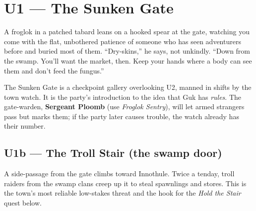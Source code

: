 \documentclass[10pt,twoside]{report}
\begin{document}
\begin{center}
\end{center}

\section{U1 --- The Sunken Gate}
\begin{readaloud}
A froglok in a patched tabard leans on a hooked spear at the gate, watching you come with the flat, unbothered patience of someone who has seen adventurers before and buried most of them. ``Dry-skins,'' he says, not unkindly. ``Down from the swamp. You'll want the market, then. Keep your hands where a body can see them and don't feed the fungus.''
\end{readaloud}
The Sunken Gate is a checkpoint gallery overlooking U2, manned in shifts by the town watch. It is the party's introduction to the idea that Guk has \emph{rules}. The gate-warden, \textbf{Sergeant Ploomb} (use \emph{Froglok Sentry}), will let armed strangers pass but marks them; if the party later causes trouble, the watch already has their number.

\subsection*{U1b --- The Troll Stair (the swamp door)}
A side-passage from the gate climbs toward Innothule. Twice a tenday, troll raiders from the swamp clans creep up it to steal spawnlings and stores. This is the town's most reliable low-stakes threat and the hook for the \emph{Hold the Stair} quest below.

\end{document}
